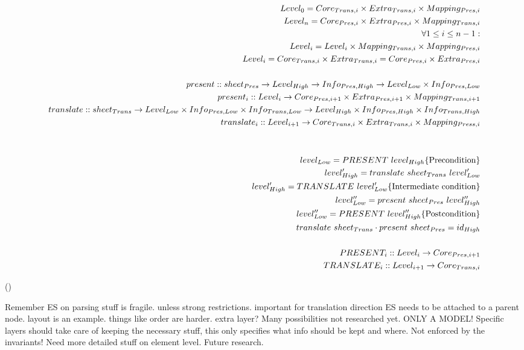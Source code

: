 \begin{small}\begin{align*}%
Level_{0} = Core_{Trans,i} \times Extra_{Trans,i} \times Mapping_{Pres,i}\\
Level_{n} = Core_{Pres,i} \times Extra_{Pres,i} \times Mapping_{Trans,i}\\
\forall 1 \le i \le n-1:  \\
Level_{i} = Level_{i} \times Mapping_{Trans,i} \times Mapping_{Pres,i}\\
Level_{i} = Core_{Trans,i} \times Extra_{Trans,i} = Core_{Pres,i} \times Extra_{Pres,i} \\
\\
present ::  sheet_{Pres} \rightarrow  Level_{High} \rightarrow Info_{Pres,High} \rightarrow Level_{Low}  \times Info_{Pres,Low} \\
present_{i} :: Level_{i} \rightarrow Core_{Pres,i+1} \times Extra_{Pres,i+1} \times Mapping_{Trans,i+1} \\
translate :: sheet_{Trans} \rightarrow  Level_{Low} \times Info_{Pres,Low} \times  Info_{Trans,Low} \rightarrow Level_{High}  \times Info_{Pres,High} \times  Info_{Trans,High}\\
translate_{i} :: Level_{i+1} \rightarrow Core_{Trans,i}  \times Extra_{Trans,i}  \times Mapping_{Press,i} \\ \\
\\
level_{Low} = PRESENT~level_{High}\hfill \text{\{Precondition\}}\\
level'_{High} = translate~sheet_{Trans}~level'_{Low}\\
level'_{High} = TRANSLATE~level'_{Low}\hfill \text{\{Intermediate condition\}}\\
level''_{Low} = present~sheet_{Pres}~level''_{High}\\
level''_{Low} = PRESENT~level''_{High}\hfill \text{\{Postcondition\}}\\
translate~sheet_{Trans}  \cdot present~sheet_{Pres} = id_{High}\\
\\
PRESENT_{i} :: Level_{i} \rightarrow Core_{Pres,i+1}\\
TRANSLATE_{i} :: Level_{i+1} \rightarrow Core_{Trans,i}\\
\end{align*} 
\end{small}
{\centering ()\\}

Remember ES on parsing stuff is fragile. unless strong restrictions. important for translation direction
ES needs to be attached to a parent node. layout is an example. things like order are harder. extra layer?
Many possibilities not researched yet.
ONLY A MODEL!
Specific layers should take care of keeping the necessary stuff, this only specifies what info should be kept and where.
Not enforced by the invariants! Need more detailed stuff on element level. Future research.


